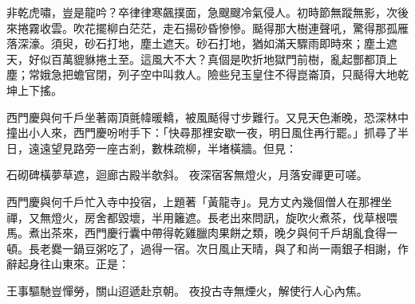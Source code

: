 非乾虎嘯，豈是龍吟？卒律律寒飆撲面，急颼颼冷氣侵人。初時節無蹤無影，次後來捲霧收雲。吹花擺柳白茫茫，走石揚砂昏慘慘。颳得那大樹連聲吼，驚得那孤雁落深濠。須臾，砂石打地，塵土遮天。砂石打地，猶如滿天驟雨即時來；塵土遮天，好似百萬貔貅捲土至。這風大不大？真個是吹折地獄門前樹，亂起酆都頂上塵；常娥急把蟾官閉，列子空中叫救人。險些兒玉皇住不得崑崙頂，只颳得大地乾坤上下搖。

西門慶與何千戶坐著兩頂氈幃暖轎，被風颳得寸步難行。又見天色漸晚，恐深林中撞出小人來，西門慶吩咐手下：「快尋那裡安歇一夜，明日風住再行罷。」抓尋了半日，遠遠望見路旁一座古剎，數株疏柳，半堵橫牆。但見：

石砌碑橫夢草遮，迴廊古殿半欹斜。
夜深宿客無燈火，月落安禪更可嗟。

西門慶與何千戶忙入寺中投宿，上題著「黃龍寺」。見方丈內幾個僧人在那裡坐禪，又無燈火，房舍都毀壞，半用籬遮。長老出來問訊，旋吹火煮茶，伐草根喂馬。煮出茶來，西門慶行囊中帶得乾雞臘肉果餅之類，晚夕與何千戶胡亂食得一頓。長老爨一鍋豆粥吃了，過得一宿。次日風止天晴，與了和尚一兩銀子相謝，作辭起身往山東來。正是：

王事驅馳豈憚勞，關山迢遞赴京朝。
夜投古寺無煙火，解使行人心內焦。
